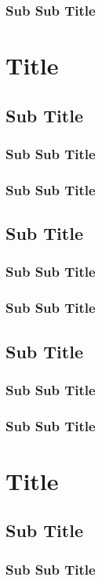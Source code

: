 \documentclass[12pt,a4paper,oneside]{article}
\begin{document}
\subsubsection{Sub Sub Title}
\lipsum[1]
\newpage
\section{Title}
\subsection{Sub Title}
\subsubsection{Sub Sub Title}
\lipsum[1]
\subsubsection{Sub Sub Title}
\lipsum[1]
\subsection{Sub Title}
\subsubsection{Sub Sub Title}
\lipsum[1]
\subsubsection{Sub Sub Title}
\lipsum[1]
\subsection{Sub Title}
\subsubsection{Sub Sub Title}
\lipsum[1]
\subsubsection{Sub Sub Title}
\lipsum[1]
\newpage
\section{Title}
\subsection{Sub Title}
\subsubsection{Sub Sub Title}
\lipsum[1]
\end{document}
